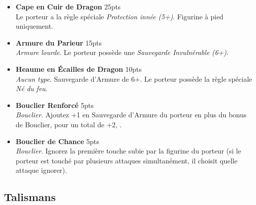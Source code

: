 \begin{multicols}{2}
\begin{itemize}[label={-}]
\item \textbf{Cape en Cuir de Dragon} \dotfill \unit{25}{pts} \\
Le porteur a la règle spéciale \emph{Protection innée (5+)}. Figurine à pied uniquement.

\item \textbf{Armure du Parieur} \dotfill \unit{15}{pts} \\
\emph{Armure lourde}. Le porteur possède une \emph{Sauvegarde Invulnérable (6+)}.

\item \textbf{Heaume en Écailles de Dragon} \dotfill \unit{10}{pts} \\
\emph{Aucun type}. Sauvegarde d'Armure de 6+. Le porteur possède la règle spéciale \emph{Né du feu}.

\item \textbf{Bouclier Renforcé} \dotfill \unit{5}{pts} \\
\emph{Bouclier}. Ajoutez +1 en Sauvegarde d'Armure du porteur en plus du bonus de Bouclier, pour un total de +2, .

\item \textbf{Bouclier de Chance} \dotfill \unit{5}{pts} \\
\emph{Bouclier}. Ignorez la première touche subie par la figurine du porteur  (si le porteur est touché par plusieurs attaques simultanément, il choisit quelle attaque ignorer).

\end{itemize}
\end{multicols}

\newpage

\subsection{Talismans}

